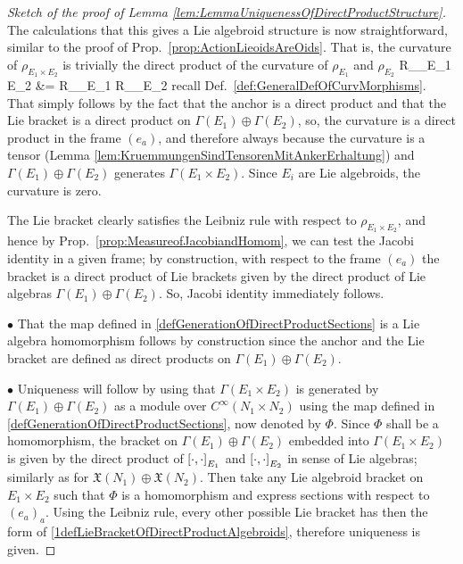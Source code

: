 \begin{proof}[Sketch of the proof of Lemma \ref{lem:LemmaUniquenessOfDirectProductStructure}]
The calculations that this gives a Lie algebroid structure is now straightforward, similar to the proof of Prop.~\ref{prop:ActionLieoidsAreOids}. That is, the curvature of $\rho_{E_1 \times E_2}$ is trivially the direct product of the curvature of $\rho_{E_1}$ and $\rho_{E_2}$
\bas
R_{\rho_{E_1 \times E_2}}
&=
R_{\rho_{E_1}} \times R_{\rho_{E_2}}
\eas
recall Def.~\ref{def:GeneralDefOfCurvMorphisms}. That simply follows by the fact that the anchor is a direct product and that the Lie bracket is a direct product on $\Gamma(E_1) \oplus \Gamma(E_2)$, so, the curvature is a direct product in the frame $(e_a)$, and therefore always because the curvature is a tensor (Lemma \ref{lem:KruemmungenSindTensorenMitAnkerErhaltung}) and $\Gamma(E_1) \oplus \Gamma(E_2)$ generates $\Gamma(E_1 \times E_2)$. Since $E_i$ are Lie algebroids, the curvature is zero.

The Lie bracket clearly satisfies the Leibniz rule with respect to $\rho_{E_1 \times E_2}$, and hence by Prop.~\ref{prop:MeasureofJacobiandHomom}, we can test the Jacobi identity in a given frame; by construction, with respect to the frame $(e_a)$ the bracket is a direct product of Lie brackets given by the direct product of Lie algebras $\Gamma(E_1) \oplus \Gamma(E_2)$. So, Jacobi identity immediately follows.

$\bullet$ That the map defined in \eqref{defGenerationOfDirectProductSections} is a Lie algebra homomorphism follows by construction since the anchor and the Lie bracket are defined as direct products on $\Gamma(E_1) \oplus \Gamma(E_2)$.

$\bullet$ Uniqueness will follow by using that $\Gamma(E_1 \times E_2)$ is generated by $\Gamma(E_1) \oplus \Gamma(E_2)$ as a module over $C^\infty(N_1 \times N_2)$ using the map defined in \eqref{defGenerationOfDirectProductSections}, now denoted by $\Phi$. Since $\Phi$ shall be a homomorphism, the bracket on $\Gamma(E_1) \oplus \Gamma(E_2)$ embedded into $\Gamma(E_1 \times E_2)$ is given by the direct product of $\mleft[ \cdot, \cdot \mright]_{E_1}$ and $\mleft[ \cdot, \cdot \mright]_{E_2}$ in sense of Lie algebras; similarly as for $\mathfrak{X}(N_1) \oplus \mathfrak{X}(N_2)$. Then take any Lie algebroid bracket on $E_1 \times E_2$ such that $\Phi$ is a homomorphism and express sections with respect to $(e_a)_a$. Using the Leibniz rule, every other possible Lie bracket has then the form of \eqref{1defLieBracketOfDirectProductAlgebroids}, therefore uniqueness is given.
\end{proof}
%
